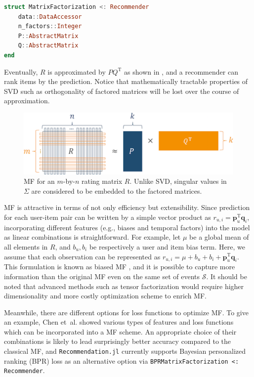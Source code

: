 \begin{lstlisting}[language = Julia]
struct MatrixFactorization <: Recommender
    data::DataAccessor
    n_factors::Integer
    P::AbstractMatrix
    Q::AbstractMatrix
end
\end{lstlisting}

Eventually, $R$ is approximated by $PQ^{\mathrm{T}}$ as shown in , and a recommender can rank items by the  prediction. Notice that mathematically tractable properties of SVD such as orthogonality of factored matrices will be lost over the course of approximation.

\begin{figure}[htbp]
  \centering
  \includegraphics[width=0.8\linewidth]{images/mf.pdf}
  \caption{MF for an $m$-by-$n$ rating matrix $R$. Unlike SVD, singular values in $\Sigma$ are considered to be embedded to the factored matrices.}
  \label{fig:mf}
\end{figure}

MF is attractive in terms of not only efficiency but extensibility. Since prediction for each user-item pair can be written by a simple vector product as $r_{u,i} = \mathbf{p}_u^{\mathrm{T}} \mathbf{q}_i$, incorporating different features (e.g., biases and temporal factors) into the model as linear combinations is straightforward. For example, let $\mu$ be a global mean of all elements in $R$, and $b_u, b_i$ be respectively a user and item bias term. Here, we assume that each observation can be represented as $r_{u,i} = \mu + b_u + b_i + \mathbf{p}_u^{\mathrm{T}} \mathbf{q}_i$. This formulation is known as biased MF \cite{Koren2009}, and it is possible to capture more information than the original MF even on the same set of events $\mathcal{S}$. It should be noted that advanced methods such as tensor factorization \cite{Karatzoglou2010} would require higher dimensionality and more costly optimization scheme to enrich MF.

Meanwhile, there are different options for loss functions to optimize MF. To give an example, Chen et~al. \cite{Chen2011} showed various types of features and loss functions which can be incorporated into a MF scheme. An appropriate choice of their combinations is likely to lead surprisingly better accuracy compared to the classical MF, and \texttt{Recommendation.jl} currently supports Bayesian personalized ranking (BPR) loss \cite{10.5555/1795114.1795167} as an alternative option via \texttt{BPRMatrixFactorization <: Recommender}.

